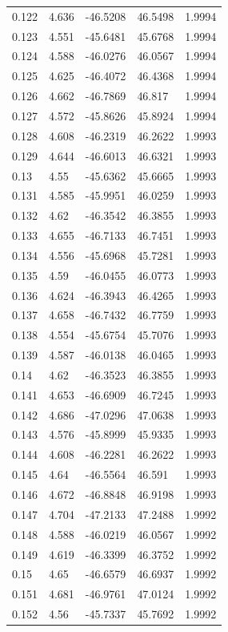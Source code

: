 \begin{tabular}{lllll}
0.122 & 4.636 & -46.5208 & 46.5498 & 1.9994 \\
0.123 & 4.551 & -45.6481 & 45.6768 & 1.9994 \\
0.124 & 4.588 & -46.0276 & 46.0567 & 1.9994 \\
0.125 & 4.625 & -46.4072 & 46.4368 & 1.9994 \\
0.126 & 4.662 & -46.7869 & 46.817 & 1.9994 \\
0.127 & 4.572 & -45.8626 & 45.8924 & 1.9994 \\
0.128 & 4.608 & -46.2319 & 46.2622 & 1.9993 \\
0.129 & 4.644 & -46.6013 & 46.6321 & 1.9993 \\
0.13 & 4.55 & -45.6362 & 45.6665 & 1.9993 \\
0.131 & 4.585 & -45.9951 & 46.0259 & 1.9993 \\
0.132 & 4.62 & -46.3542 & 46.3855 & 1.9993 \\
0.133 & 4.655 & -46.7133 & 46.7451 & 1.9993 \\
0.134 & 4.556 & -45.6968 & 45.7281 & 1.9993 \\
0.135 & 4.59 & -46.0455 & 46.0773 & 1.9993 \\
0.136 & 4.624 & -46.3943 & 46.4265 & 1.9993 \\
0.137 & 4.658 & -46.7432 & 46.7759 & 1.9993 \\
0.138 & 4.554 & -45.6754 & 45.7076 & 1.9993 \\
0.139 & 4.587 & -46.0138 & 46.0465 & 1.9993 \\
0.14 & 4.62 & -46.3523 & 46.3855 & 1.9993 \\
0.141 & 4.653 & -46.6909 & 46.7245 & 1.9993 \\
0.142 & 4.686 & -47.0296 & 47.0638 & 1.9993 \\
0.143 & 4.576 & -45.8999 & 45.9335 & 1.9993 \\
0.144 & 4.608 & -46.2281 & 46.2622 & 1.9993 \\
0.145 & 4.64 & -46.5564 & 46.591 & 1.9993 \\
0.146 & 4.672 & -46.8848 & 46.9198 & 1.9993 \\
0.147 & 4.704 & -47.2133 & 47.2488 & 1.9992 \\
0.148 & 4.588 & -46.0219 & 46.0567 & 1.9992 \\
0.149 & 4.619 & -46.3399 & 46.3752 & 1.9992 \\
0.15 & 4.65 & -46.6579 & 46.6937 & 1.9992 \\
0.151 & 4.681 & -46.9761 & 47.0124 & 1.9992 \\
0.152 & 4.56 & -45.7337 & 45.7692 & 1.9992 \\

\end{tabular}
